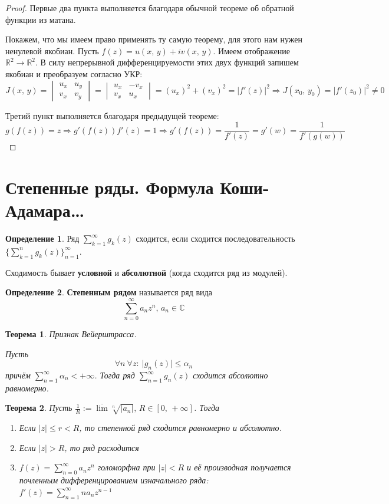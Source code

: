 \documentclass[a4paper,12pt]{article}
\renewcommand{\leq}{\ensuremath{\leqslant}}
\theoremstyle{plain}
\newtheorem{theorem}{Теорема}[section]
\theoremstyle{definition}
\newtheorem{definition}{Определение}[section]
\theoremstyle{remark}
\begin{document}
\begin{proof}
	Первые два пункта выполняется благодаря обычной теореме об обратной функции из матана.

	Покажем, что мы имеем право применять ту самую теорему, для этого нам нужен ненулевой якобиан. Пусть $f(z) = u(x,\,y) + iv(x,\,y)$. Имеем отображение $\mathbb{R}^2 \to \mathbb{R}^2$. В силу непрерывной дифференцируемости этих двух функций запишем якобиан и преобразуем согласно УКР:
	\[
		J(x,\,y) = \begin{vmatrix}
			u_x & u_y \\
			v_x & v_y
		\end{vmatrix} = \begin{vmatrix}
			u_x & -v_x \\
			v_x & u_x
		\end{vmatrix} = (u_x)^2 + (v_x)^2 = \vert f'(z)\vert^2 \Rightarrow J(x_0,\, y_0) = \vert f'(z_0)\vert^2 \neq 0
	\]

	Третий пункт выполняется благодаря предыдущей теореме:
	\[
		g(f(z)) = z \Rightarrow g'(f(z))f'(z) = 1 \Rightarrow g'(f(z)) = \frac{1}{f'(z)} = g'(w) = \frac{1}{f'(g(w))}
	\]
\end{proof}

\section{Степенные ряды. Формула Коши-Адамара\dots}
\begin{definition}
	Ряд $\sum_{k = 1}^\infty g_k(z)$ сходится, если сходится последовательность $\{\sum_{k=1}^n g_k(z)\}_{n = 1}^\infty$.

	Сходимость бывает \textbf{условной} и \textbf{абсолютной} (когда сходится ряд из модулей).
\end{definition}

\begin{definition}
	\textbf{Степенным рядом} называется ряд вида
	\[
		\sum_{n = 0}^\infty a_nz^n,\, a_n \in \mathbb{C}
	\]
\end{definition}

\begin{theorem}
	Признак Вейерштрасса.

	Пусть
	\[
		\forall n \: \forall z:\: \vert g_n(z)\vert \leq \alpha_n
	\]
	причём $\sum_{n = 1}^\infty \alpha_n < +\infty$. Тогда ряд $\sum_{n = 1}^\infty g_n(z)$ сходится абсолютно равномерно.
\end{theorem}

\begin{theorem}
	Пусть $\frac{1}{R} := \overline{\lim}\sqrt[n]{\vert a_n\vert},\, R \in [0,\, +\infty]$. Тогда
	\begin{enumerate}
		\item Если $\vert z\vert \leq r < R$, то степенной ряд сходится равномерно и абсолютно.
		\item Если $\vert z\vert > R$, то ряд расходится
		\item $f(z) = \sum_{n = 0}^\infty a_nz^n$ голоморфна при $\vert z\vert < R$ и её производная получается почленным дифференцированием изначального ряда: $f'(z) = \sum_{n = 1}^\infty na_nz^{n-1}$
	\end{enumerate}
\end{theorem}
\end{document}
